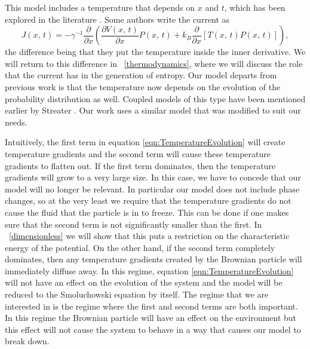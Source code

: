 This model includes a temperature that depends on $x$ and $t$, which has been explored in the literature \cite{Kramers1940}. Some authors write the current as \cite{Kramers1940,Kampen1988}
\begin{equation}
J(x, \, t) = -\gamma^{-1} \frac{\partial}{\partial x} \left (\frac{\partial V(x, \, t)}{\partial x} P(x, \, t) + k_B \frac{\partial}{\partial x}[T(x, \, t) P(x, \, t)] \right ),  \label{eqn:diffCurrent}
\end{equation}
the difference being that they put the temperature inside the inner derivative. We will return to this difference in ~\autoref{thermodynamics}, where we will discuss the role that the current has in the generation of entropy.
Our model departs from previous work is that the temperature now depends on the evolution of the probability distribution as well. Coupled models of this type have been mentioned earlier by Streater \cite{Streater1997, Streater1997a,Streater2000,Streater1997b}. Our work uses a similar model that was modified to suit our needs.

Intuitively, the first term in equation \ref{eqn:TemperatureEvolution} will create temperature gradients and the second term will cause these temperature gradients to flatten out. If the first term dominates, then the temperature gradients will grow to a very large size. In this case, we have to concede that our model will no longer be relevant. In particular our model does not include phase changes, so at the very least we require that the temperature gradients do not cause the fluid that the particle is in to freeze. This can be done if one makes sure that the second term is not significantly smaller than the first. In ~\autoref{dimensionless} we will show that this puts a restriction on the characteristic energy of the potential. On the other hand, if the second term completely dominates, then any temperature gradients created by the Brownian particle will immediately diffuse away. In this regime, equation \ref{eqn:TemperatureEvolution} will not have an effect on the evolution of the system and the model will be reduced to the Smoluchowski equation by itself. The regime that we are interested in is the regime where the first and second terms are both important. In this regime the Brownian particle will have an effect on the environment but this effect will not cause the system to behave in a way that causes our model to break down. 

